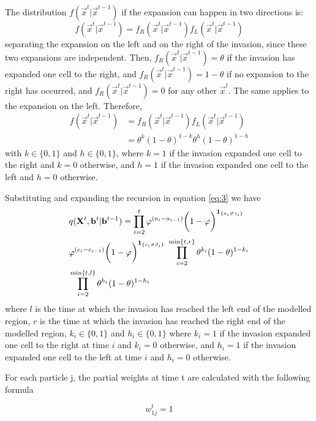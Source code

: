 The distribution $f(\vec{x}^{t} | \vec{x}^{t-1})$ if the expansion can happen in two directions is:
\begin{equation*}
    f(\vec{x}^{t} | \vec{x}^{t-1}) = f_R(\vec{x}^{t} | \vec{x}^{t-1}) f_L(\vec{x}^{t} | \vec{x}^{t-1}) 
\end{equation*}
separating the expansion on the left and on the right of the invasion, since
these two expansions are independent. Then, $f_R(\vec{x}^{t} | \vec{x}^{t-1}) = \theta$ if the invasion has expanded one cell to the right, and $f_R(\vec{x}^{t} | \vec{x}^{t-1}) = 1 - \theta$ if no expansion to the right has occurred, and $f_R(\vec{x}^{t} | \vec{x}^{t-1}) = 0$ for any other $\vec{x}^{t}$. The same applies to the expansion on the left. Therefore,
\begin{align*}
    f(\vec{x}^{t} | \vec{x}^{t-1}) &= f_R(\vec{x}^{t} | \vec{x}^{t-1}) f_L(\vec{x}^{t} | \vec{x}^{t-1})\\
    & = \theta^{k} (1-\theta)^{1-k}\theta^{h} (1-\theta)^{1-h} 
\end{align*}
with $k \in \{0,1\}$ and $h \in \{0,1\}$, where $k = 1$ if the invasion expanded one cell to the right and $k = 0$ otherwise, and $h = 1$ if the invasion expanded one cell to the left and $h = 0$ otherwise.

Substituting and expanding the recursion in equation \eqref{eq:3} we have
\begin{align}
    & q(\mathbf{X}^{t},\mathbf{b}^{t} | \mathbf{b}^{t-1}) =  \prod_{i=2}^{t} \varphi^{(a_{i} - a_{i-1})}\bigg(1 - \varphi \bigg)^{\mathbf{1}_{\{a_i \neq \gamma_i\}}} \nonumber \\
    & \varphi^{(c_{i} - c_{i-1})} \bigg(1 - \varphi\bigg)^{\mathbf{1}_{\{c_i \neq \beta_i\}}} \; \prod_{i=2}^{\min\{t,r\}} \theta^{k_i} (1-\theta)^{1-k_i}  \label{eq:4} \\ 
    & \prod_{i=2}^{\min\{t,l\}} \theta^{h_i} (1-\theta)^{1-h_i} \nonumber
\end{align}
where $l$ is the time at which the invasion has reached the left end of the modelled region, $r$ is the time at which the invasion has reached the right end of the modelled region, $k_i \in \{0,1\}$ and $h_i \in \{0,1\}$ where $k_i = 1$  if the invasion expanded one cell to the right at time $i$ and $k_i = 0$ otherwise, and $h_i = 1$ if the invasion expanded one cell to the left at time $i$ and $h_i = 0$ otherwise.


For each particle j, the partial weights at time t are calculated with the following formula

\begin{equation*}
    w_{1j}^t = 1
\end{equation*}

